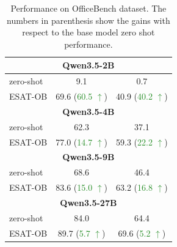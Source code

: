 \begin{table}[t]
{\begin{tabular}[b]{lcc}
\multicolumn{3}{c}{\bf Qwen3.5-2B}\\
\midrule
zero-shot & \phantom{0}9.1 & \phantom{0}0.7 \\
\textsc{ESAT-OB} & {69.6} (\textcolor{ForestGreen}{60.5 $\uparrow$}) & {40.9} (\textcolor{ForestGreen}{40.2 $\uparrow$})  \\
\midrule

\multicolumn{3}{c}{\bf Qwen3.5-4B}\\
\midrule
zero-shot & 62.3 & 37.1 \\
\textsc{ESAT-OB} & {77.0} (\textcolor{ForestGreen}{14.7 $\uparrow$}) & {59.3} (\textcolor{ForestGreen}{22.2 $\uparrow$})  \\
\midrule

\multicolumn{3}{c}{\bf Qwen3.5-9B}\\
\midrule
zero-shot & 68.6 & 46.4  \\
\textsc{ESAT-OB} & {83.6} (\textcolor{ForestGreen}{15.0 $\uparrow$}) & {63.2} (\textcolor{ForestGreen}{16.8 $\uparrow$})  \\

\midrule
\multicolumn{3}{c}{\bf Qwen3.5-27B}\\
\midrule
zero-shot & 84.0 & 64.4  \\
\textsc{ESAT-OB} & {89.7} (\textcolor{ForestGreen}{5.7 $\uparrow$}) & {69.6} (\textcolor{ForestGreen}{5.2 $\uparrow$})  \\
\bottomrule
\end{tabular}
}
\caption{Performance on OfficeBench dataset. The numbers in parenthesis show the gains with respect to the base model zero shot performance.}
\label{tab:officebench_main_results}
\end{table}
